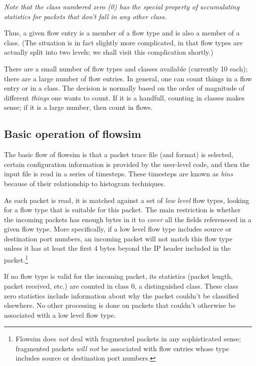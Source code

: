 \documentclass{article}
\begin{document}
\emph{Note that the class numbered zero (0) has the special property of
accumulating statistics for packets that don't fall in any other
class.}

Thus, a given flow entry is a member of a flow type and is also a
member of a class.  (The situation is in fact slightly more
complicated, in that flow types are actually split into two levels; we
shall visit this complication shortly.)

There are a small number of flow types and classes available (currently
10 each); there are a large number of flow entries.  In general, one
can count things in a flow entry or in a class.  The decision is
normally based on the order of magnitude of different \emph{things} one
wants to count.  If it is a handfull, counting in classes makes sense;
if it is a large number, then count in flows.
\subsection{Basic operation of flowsim}

The basic flow of flowsim is that a packet trace file (and format) is
selected, certain configuration information is provided by the
user-level code, and
then the input file is read in a series of timesteps.  These
timesteps are known as \emph{bins} because of their relationship to
histogram techniques.

As each packet is read, it is matched against a set of \emph{low level}
flow types, looking for a flow type that is suitable for this packet.
The main restriction is whether the incoming packets has enough bytes
in it to \emph{cover} all the fields refereneced in a given flow type.
More specifically, if a low level flow type includes source or
destination port numbers, an incoming packet will not match this flow
type unless it has at least the first 4 bytes beyond the IP header
included in the packet.\footnote{
Flowsim does \emph{not} deal with fragmented packets in any
sophisticated sense; fragmented packets \emph{will not} be associated
with flow entries whose type includes source or destination port
numbers.}

If no flow type is valid for the incoming packet, its statistics
(packet length, packet received, etc.) are counted in class 0, a
distinguished class.  These class zero statistics include information
about why the packet couldn't be classified elsewhere.  No other
processing is done on packets that couldn't otherwise be associated
with a low level flow type.
\end{document}
